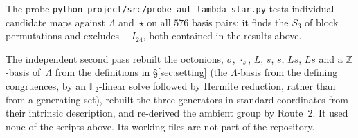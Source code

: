 \documentclass[11pt]{amsart}
\newcommand{\LL}{\Lambda}
\newcommand{\ZZ}{\mathbb{Z}}
\newcommand{\FF}{\mathbb{F}}
\theoremstyle{definition}
\theoremstyle{remark}
\begin{document}
The probe \texttt{python\_project/src/probe\_aut\_lambda\_star.py} tests
individual candidate maps against $\LL$ and~$\star$ on all $576$ basis pairs;
it finds the $S_3$ of block permutations and excludes~$-I_{24}$, both
contained in the results above.

The independent second pass rebuilt the octonions, $\sigma$, $\cdot_s$, $L$,
$s$, $\bar s$, $Ls$, $L\bar s$ and a $\ZZ$-basis of~$\LL$ from the definitions
in \S\ref{sec:setting} (the $\LL$-basis from the defining congruences, by an
$\FF_2$-linear solve followed by Hermite reduction, rather than from a
generating set), rebuilt the three generators in standard coordinates from
their intrinsic description, and re-derived the ambient group by Route~2. It
used none of the scripts above. Its working files are not part of the
repository.
\end{document}
